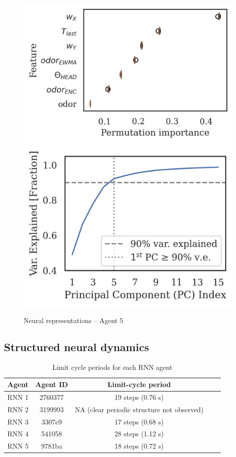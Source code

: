 \documentclass[5p,twocolumn,authoryear]{elsarticle}
\begin{document}
\begin{figure}[h!]
\begin{center}
\includegraphics[width=0.34\linewidth]{repr_9781ba.png}
\includegraphics[width=0.30\linewidth]{scree_9781ba.png}
\caption{Neural representations -- Agent 5}
\end{center}
\end{figure}


\clearpage
\subsection{Structured neural dynamics}
\label{sec_supp_dynamics}

\begin{table}[h!]
    \centering
    \begin{tabular}{ccccc}
     \hline\hline
     \textbf{Agent} & \textbf{Agent ID} & \textbf{Limit-cycle period}  \\
     \hline   
        RNN 1 & 2760377 & 19 steps (0.76 s) \\ \hline
        RNN 2 & 3199993 & NA (clear periodic structure not observed)  \\ \hline
        RNN 3 & 3307e9 & 17 steps (0.68 s) \\ \hline
        RNN 4 & 541058 & 28 steps (1.12 s) \\ \hline
        RNN 5 & 9781ba & 18 steps (0.72 s) \\ \hline
     \hline
    \end{tabular}
    \caption{Limit cycle periods for each RNN agent}
\label{table_supp_LC}
\end{table}
\end{document}

